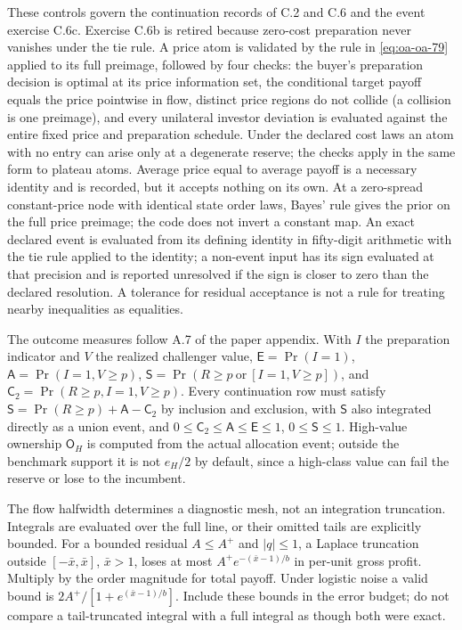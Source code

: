 \documentclass[
  11pt,
]{article}
\begin{document}
These controls govern the continuation records of C.2 and C.6 and the
event exercise C.6c. Exercise C.6b is retired because zero-cost
preparation never vanishes under the tie rule. A price atom is validated by the
rule in \eqref{eq:oa-oa-79} applied to its full preimage, followed by
four checks: the buyer's preparation decision is optimal at
its price information set, the conditional target payoff equals the
price pointwise in flow, distinct price regions do not
collide (a collision is one preimage), and every unilateral investor
deviation is evaluated against the entire fixed price and preparation
schedule. Under the declared cost laws an atom with no entry can arise only
at a degenerate reserve; the checks apply in the same form to plateau atoms.
Average price equal to average payoff is a necessary identity
and is recorded, but it accepts nothing on its own. At a zero-spread
constant-price node with identical state order laws, Bayes' rule gives
the prior on the full price preimage; the code does not invert a
constant map. An exact declared
event is evaluated from its defining identity in fifty-digit arithmetic
with the tie rule applied to the identity; a non-event input has its
sign evaluated at that precision and is reported unresolved if the sign
is closer to zero than the declared resolution. A tolerance for residual
acceptance is not a rule for treating nearby inequalities as equalities.

The outcome measures follow A.7 of the paper appendix. With \(I\) the
preparation indicator and \(V\) the realized challenger value,
\(\mathsf E=\Pr(I=1)\), \(\mathsf A=\Pr(I=1,V\ge p)\),
\(\mathsf S=\Pr(R\ge p\ \text{or}\ [I=1,V\ge p])\), and
\(\mathsf C_2=\Pr(R\ge p,I=1,V\ge p)\). Every continuation row must
satisfy \(\mathsf S=\Pr(R\ge p)+\mathsf A-\mathsf C_2\) by inclusion and
exclusion, with \(\mathsf S\) also integrated directly as a union event,
and \(0\le\mathsf C_2\le\mathsf A\le\mathsf E\le1\),
\(0\le\mathsf S\le1\). High-value ownership \(\mathsf O_H\) is computed
from the actual allocation event; outside the benchmark support it is
not \(e_H/2\) by default, since a high-class value can fail the reserve
or lose to the incumbent.

The flow halfwidth determines a diagnostic mesh, not an integration
truncation. Integrals are evaluated over the full line, or their omitted
tails are explicitly bounded. For a bounded residual \(A\le A^+\)
and \(|q|\le1\), a Laplace truncation outside \([-\bar x,\bar x]\),
\(\bar x>1\), loses at most \(A^+e^{-(\bar x-1)/b}\) in per-unit gross
profit. Multiply
by the order magnitude for total payoff. Under logistic noise a valid
bound is \(2A^+/[1+e^{(\bar x-1)/b}]\). Include these bounds in the
error budget; do not compare a tail-truncated integral with a full
integral as though both were exact.
\end{document}
